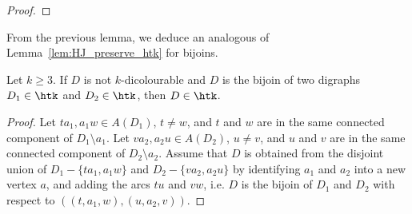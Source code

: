 \begin{proof}
      \end{proof}

From the previous lemma, we deduce an analogous of Lemma~\ref{lem:HJ_preserve_htk} for bijoins.

\begin{lemma}\label{lem:HBJ_preservehtk}
   Let $k\geq 3$. If $D$ is not $k$-dicolourable and $D$ is the bijoin of two digraphs $D_1\in \htk$ and $D_2\in \htk$, then $D\in \htk$. 
\end{lemma}

 \begin{proof}
        Let $ta_1, a_1w \in A(D_1)$, $t \neq w$,  and $t$ and $w$ are in the same connected component of $D_1 \setminus a_1$. Let $va_2, a_2u \in A(D_2)$, $u \neq v$,  and $u$ and $v$ are in the same connected component of $D_2 \setminus a_2$.
        Assume that $D$ is obtained from the disjoint union of $D_1 - \{ta_1, a_1w\}$ and $D_2 - \{va_2,a_2u\}$ by identifying $a_1$ and $a_2$ into a new vertex $a$, and adding the arcs $tu$ and $vw$, i.e. $D$ is the bijoin of $D_1$ and $D_2$ with respect to $((t,a_1, w),(u, a_2, v))$. 
        
    

    

        

\end{proof}
